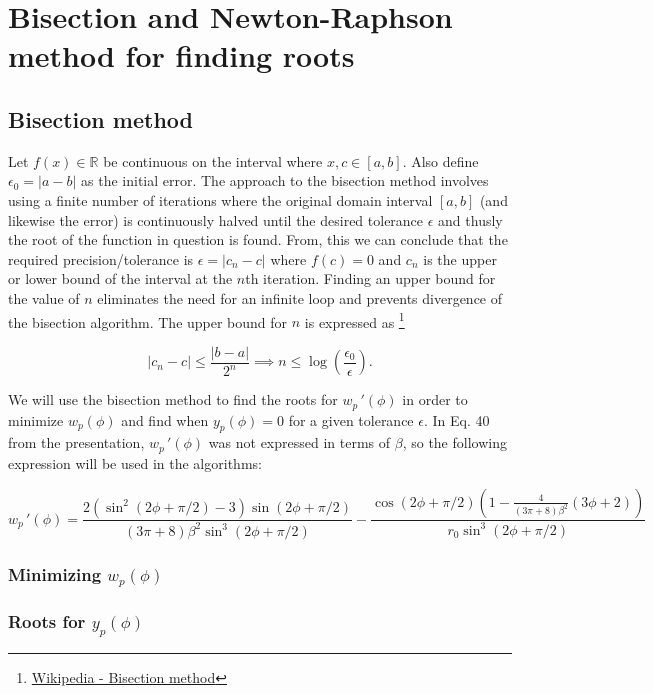 \section{Bisection and Newton-Raphson method for finding roots}

\subsection{Bisection method}

Let $f(x)\in \mathbb{R}$ be continuous on the interval where $x,c\in [a,b]$. Also define $\epsilon_0=|a-b|$ as the initial error. The approach to the bisection method involves using a finite number of iterations where the original domain interval $[a,b]$ (and likewise the error) is continuously halved until the desired tolerance $\epsilon$ and thusly the root of the function in question is found.
From, this we can conclude that the required precision/tolerance is $\epsilon=|c_n-c|$ where $f(c)=0$ and $c_n$ is the upper or lower bound of the interval at the $n$th iteration.
Finding an upper bound for the value of $n$ eliminates the need for an infinite loop and prevents divergence of the bisection algorithm. The upper bound for $n$ is expressed as \footnote{\href{https://en.wikipedia.org/wiki/Bisection_method}{Wikipedia - Bisection method}}

\begin{equation}
    |c_n-c|\leq \frac{|b-a|}{2^n}\implies n\leq \log(\frac{\epsilon_0}{\epsilon}).
\end{equation}

We will use the bisection method to find the roots for $w_p\,'(\phi)$ in order to minimize $w_p(\phi)$ and find when $y_p(\phi)=0$ for a given tolerance $\epsilon$.
In Eq. 40 from the presentation, $w_p\,'(\phi)$ was not expressed in terms of $\beta$, so the following expression will be used in the algorithms:


\begin{equation}
    w_p\,'(\phi)=\frac{2(\sin^2(2\phi+\pi/2)-3)\sin(2\phi+\pi/2)}{(3\pi+8)\beta^2\sin^3(2\phi+\pi/2)}
    -\frac{\cos(2\phi+\pi/2)\left(1-\frac{4}{(3\pi+8)\beta^2}(3\phi+2)\right)}{r_0\sin^3(2\phi+\pi/2)}
\end{equation}

\subsubsection{Minimizing \texorpdfstring{$w_p(\phi)$}{}}

\subsubsection{Roots for \texorpdfstring{$y_p(\phi)$}{}}

